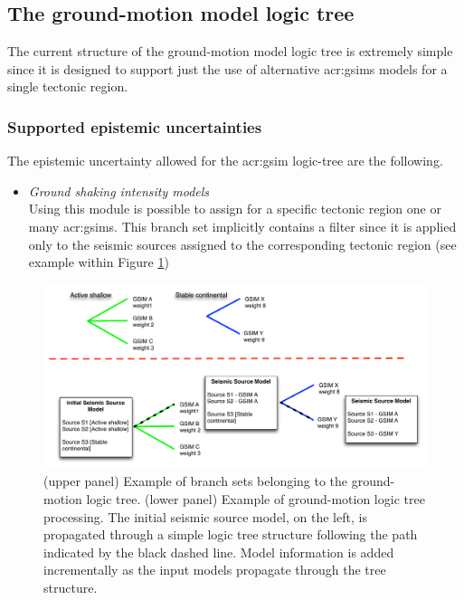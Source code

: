 \subsection{The ground-motion model logic tree}
The current structure of the ground-motion model logic tree is extremely simple
since it is designed to support just the use of alternative \glspl{acr:gsim}
models for a single tectonic region.
%
\subsubsection{Supported epistemic uncertainties}
The epistemic uncertainty allowed for the \gls{acr:gsim} logic-tree are the
following.
\begin{itemize}
    \item \emph{Ground shaking intensity models} \hfill \\
        Using this module is possible to assign for a specific tectonic region
        one or many \glspl{acr:gsim}. This branch set implicitly contains a 
        filter since it is applied only to the seismic sources assigned to the
        corresponding tectonic region (see example within Figure 
        \ref{fig:logic_tree_gsim})
\end{itemize}
%
\begin{figure}[!ht]
\centering
\includegraphics[width=\textwidth]{./Pictures/lts/logic_tree_gsim.pdf}
\caption{(upper panel) Example of branch sets belonging to the ground-motion 
logic tree. (lower panel) Example of ground-motion logic tree processing. 
The initial seismic source model, on the left,  is propagated through a simple 
logic tree structure following the path indicated by the black dashed line.
Model information is added incrementally as the input models propagate 
through the tree structure.}
\label{fig:logic_tree_gsim}
\end{figure}
%

